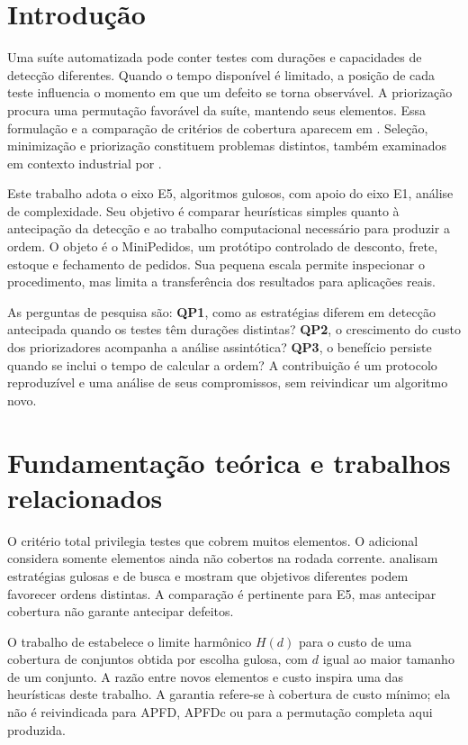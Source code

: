\documentclass[12pt]{article}
\begin{document}
\section{Introdução}
Uma suíte automatizada pode conter testes com durações e capacidades de detecção diferentes. Quando o tempo disponível é limitado, a posição de cada teste influencia o momento em que um defeito se torna observável. A priorização procura uma permutação favorável da suíte, mantendo seus elementos. Essa formulação e a comparação de critérios de cobertura aparecem em \cite{R01}. Seleção, minimização e priorização constituem problemas distintos, também examinados em contexto industrial por \cite{R06}.

Este trabalho adota o eixo E5, algoritmos gulosos, com apoio do eixo E1, análise de complexidade. Seu objetivo é comparar heurísticas simples quanto à antecipação da detecção e ao trabalho computacional necessário para produzir a ordem. O objeto é o MiniPedidos, um protótipo controlado de desconto, frete, estoque e fechamento de pedidos. Sua pequena escala permite inspecionar o procedimento, mas limita a transferência dos resultados para aplicações reais.

As perguntas de pesquisa são: \textbf{QP1}, como as estratégias diferem em detecção antecipada quando os testes têm durações distintas? \textbf{QP2}, o crescimento do custo dos priorizadores acompanha a análise assintótica? \textbf{QP3}, o benefício persiste quando se inclui o tempo de calcular a ordem? A contribuição é um protocolo reproduzível e uma análise de seus compromissos, sem reivindicar um algoritmo novo.
\section{Fundamentação teórica e trabalhos relacionados}
O critério total privilegia testes que cobrem muitos elementos. O adicional considera somente elementos ainda não cobertos na rodada corrente. \cite{R04} analisam estratégias gulosas e de busca e mostram que objetivos diferentes podem favorecer ordens distintas. A comparação é pertinente para E5, mas antecipar cobertura não garante antecipar defeitos.

O trabalho de \cite{R07} estabelece o limite harmônico $H(d)$ para o custo de uma cobertura de conjuntos obtida por escolha gulosa, com $d$ igual ao maior tamanho de um conjunto. A razão entre novos elementos e custo inspira uma das heurísticas deste trabalho. A garantia refere-se à cobertura de custo mínimo; ela não é reivindicada para APFD, APFDc ou para a permutação completa aqui produzida.
\end{document}
